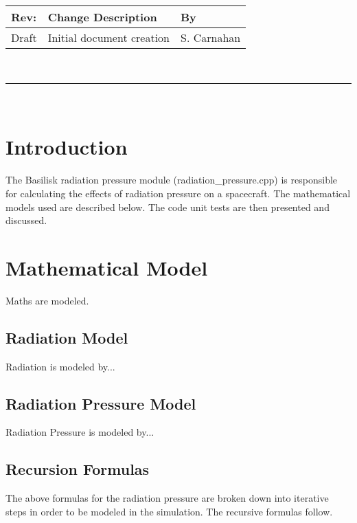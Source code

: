 \documentclass[]{BasiliskReportMemo}
\newcommand{\preparer}{S. Carnahan}
\begin{document}
\makeCover


%
%
\pagestyle{empty}
{\renewcommand{\arraystretch}{1.1}
\noindent
\begin{longtable}{|p{0.5in}|p{4.5in}|p{1.14in}|}
\hline
{\bfseries Rev}: & {\bfseries Change Description} & {\bfseries By} \\
\hline
Draft & Initial document creation & \preparer\\
\hline

\end{longtable}
}

\newpage
\setcounter{page}{1}
\pagestyle{fancy}

\tableofcontents
~\\ \hrule ~\\


\section{Introduction}
The Basilisk radiation pressure module (radiation\_pressure.cpp) is responsible for calculating the effects of radiation pressure on a spacecraft. The mathematical models used are described below. The code unit tests are then presented and discussed.

\section{Mathematical Model}
Maths are modeled.
\subsection{Radiation Model}
Radiation is modeled by...
\subsection{Radiation Pressure Model}
Radiation Pressure is modeled by...
\subsection{Recursion Formulas}
The above formulas for the radiation pressure are broken down into iterative steps in order to be modeled in the simulation. The recursive formulas follow.
\end{document}
